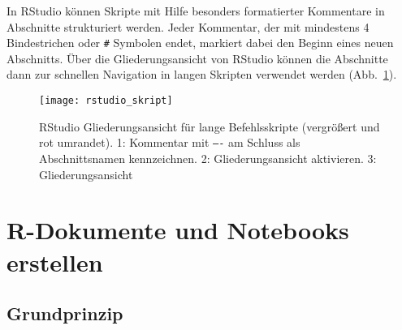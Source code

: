 In RStudio können Skripte mit Hilfe besonders formatierter Kommentare in Abschnitte strukturiert werden. Jeder Kommentar, der mit mindestens 4 Bindestrichen oder \lstinline!#! Symbolen endet, markiert dabei den Beginn eines neuen Abschnitts. Über die Gliederungsansicht von RStudio können die Abschnitte dann zur schnellen Navigation in langen Skripten verwendet werden (Abb.\ \ref{fig:rstudio_skript}).

\begin{figure}[ht]
\centering
\texttt{[image: rstudio\_skript]}
\vspace*{-0.5em}
\caption{RStudio Gliederungsansicht für lange Befehlsskripte (vergrößert und rot umrandet). 1: Kommentar mit \texttt{----} am Schluss als Abschnittsnamen kennzeichnen. 2: Gliederungsansicht aktivieren. 3: Gliederungsansicht}
\label{fig:rstudio_skript}
\end{figure}

\section{R-Dokumente und Notebooks erstellen}
\label{sec:rmd}


\subsection{Grundprinzip}

